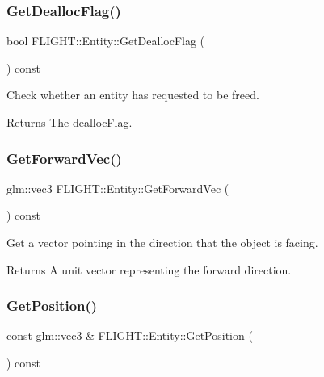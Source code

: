 \subsubsection{\texorpdfstring{Get\+Dealloc\+Flag()}{GetDeallocFlag()}}
{\footnotesize\ttfamily bool F\+L\+I\+G\+H\+T\+::\+Entity\+::\+Get\+Dealloc\+Flag (\begin{DoxyParamCaption}{ }\end{DoxyParamCaption}) const}



Check whether an entity has requested to be freed. 

\begin{DoxyReturn}{Returns}
The dealloc\+Flag. 
\end{DoxyReturn}
\mbox{\label{class_f_l_i_g_h_t_1_1_entity_a5c4655be394d009657705f6300e7663c}} 
\subsubsection{\texorpdfstring{Get\+Forward\+Vec()}{GetForwardVec()}}
{\footnotesize\ttfamily glm\+::vec3 F\+L\+I\+G\+H\+T\+::\+Entity\+::\+Get\+Forward\+Vec (\begin{DoxyParamCaption}{ }\end{DoxyParamCaption}) const}



Get a vector pointing in the direction that the object is facing. 

\begin{DoxyReturn}{Returns}
A unit vector representing the forward direction. 
\end{DoxyReturn}
\mbox{\label{class_f_l_i_g_h_t_1_1_entity_a3382ef22723d49381cfb769a6cbb1e40}} 
\subsubsection{\texorpdfstring{Get\+Position()}{GetPosition()}}
{\footnotesize\ttfamily const glm\+::vec3 \& F\+L\+I\+G\+H\+T\+::\+Entity\+::\+Get\+Position (\begin{DoxyParamCaption}{ }\end{DoxyParamCaption}) const}



